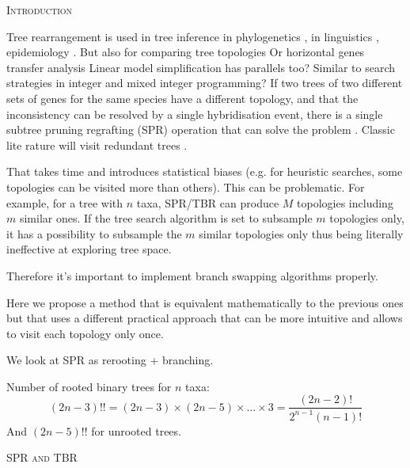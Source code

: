 \documentclass[12pt,letterpaper]{article}
\renewcommand{\section}[1]{%
\bigskip
\begin{center}
\begin{Large}
\normalfont\scshape #1
\medskip
\end{Large}
\end{center}}
\begin{document}
\section{Introduction}

Tree rearrangement is used in tree inference in phylogenetics \citep[e.g.][]{swofford2003paup,Stamatakis21012014,Ronquist2012mrbayes}, in linguistics \citep[e.g.][]{Bouckaert24082012}, epidemiology \citep[e.g.][]{Gire1369}.
But also for comparing tree topologies \citep[e.g.][]{allen2001subtree,kuhner2015treComparison}
Or horizontal genes transfer analysis \citep[e.g.][]{mcfadden1995something,bordewich2005computational}
Linear model simplification has parallels too?
Similar to search strategies in integer and mixed integer programming?
If two trees of two different sets of genes for the same species have a different topology, and that the inconsistency can be resolved by a single hybridisation event, there is a single subtree pruning regrafting (SPR) operation that can solve the problem \citep{bordewich2005computational}.
Classic lite rature will visit redundant trees \citep{allen2001subtree,felsenstein2004inferring}.


That takes time and introduces statistical biases (e.g. for heuristic searches, some topologies can be visited more than others).
This can be problematic. For example, for a tree with $n$ taxa, SPR/TBR can produce $M$ topologies including $m$ similar ones.
If the tree search algorithm is set to subsample $m$ topologies only, it has a possibility to subsample the $m$ similar topologies only thus being literally ineffective at exploring tree space.


Therefore it's important to implement branch swapping algorithms properly.

Here we propose a method that is equivalent mathematically to the previous ones \citep{felsenstein2004inferring} but that uses a different practical approach that can be more intuitive and allows to visit each topology only once.

We look at SPR as rerooting + branching.

Number of rooted binary trees for $n$ taxa:
\begin{equation}
(2n-3)!!=(2n-3)\times(2n-5)\times...\times3=\frac{(2n-2)!}{2^{n-1}(n-1)!}
\end{equation}
And $(2n-5)!!$ for unrooted trees.


\section{SPR and TBR}
\end{document}
